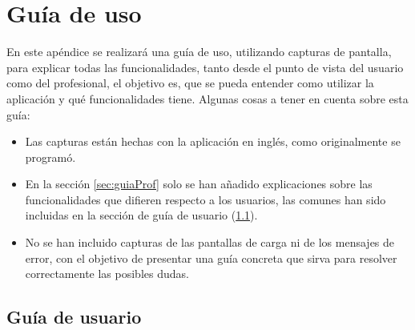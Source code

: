 \chapter{Guía de uso}
\label{Appendix:guiaUsuario}
En este apéndice se realizará una guía de uso, utilizando capturas de pantalla, para explicar todas las funcionalidades, tanto desde el punto de vista del usuario como del profesional, el objetivo es, que se pueda entender como utilizar la aplicación y qué funcionalidades tiene. Algunas cosas a tener en cuenta sobre esta guía: 
\begin{itemize}
    \item Las capturas están hechas con la aplicación en inglés, como originalmente se programó.
    \item En la sección \ref{sec:guiaProf} solo se han añadido explicaciones sobre las funcionalidades que difieren respecto a los usuarios, las comunes han sido incluidas en la sección de guía de usuario (\ref{sec:guiaUser}).
    \item No se han incluido capturas de las pantallas de carga ni de los mensajes de error, con el objetivo de presentar una guía concreta que sirva para resolver correctamente las posibles dudas.
\end{itemize}

\newpage
\section{Guía de usuario}
\label{sec:guiaUser}
